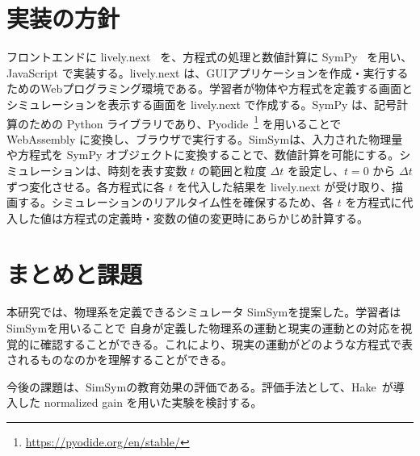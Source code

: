 \documentclass[11pt, a4paper, oneside, twocolumn, dvipdfmx]{jsarticle}
\newcommand{\simname}{SimSym}
\begin{document}
\section{実装の方針} \label{sec3}
フロントエンドに lively.next~\cite{ingalls_2008} を、方程式の処理と数値計算に SymPy~\cite{meurer_sympy_2017} を用い、JavaScript で実装する。lively.next は、GUIアプリケーションを作成・実行するためのWebプログラミング環境である。学習者が物体や方程式を定義する画面とシミュレーションを表示する画面を lively.next で作成する。SymPy は、記号計算のための Python ライブラリであり、Pyodide~\footnote{\url{https://pyodide.org/en/stable/}} を用いることで WebAssembly に変換し、ブラウザで実行する。\simname は、入力された物理量や方程式を SymPy オブジェクトに変換することで、数値計算を可能にする。シミュレーションは、時刻を表す変数 $t$ の範囲と粒度 $\Delta t$ を設定し、$t=0$ から $\Delta t$ ずつ変化させる。各方程式に各 $t$ を代入した結果を lively.next が受け取り、描画する。シミュレーションのリアルタイム性を確保するため、各 $t$ を方程式に代入した値は方程式の定義時・変数の値の変更時にあらかじめ計算する。

\section{まとめと課題}
本研究では、物理系を定義できるシミュレータ \simname を提案した。学習者は\simname を用いることで
自身が定義した物理系の運動と現実の運動との対応を視覚的に確認することができる。これにより、現実の運動がどのような方程式で表されるものなのかを理解することができる。

今後の課題は、\simname の教育効果の評価である。評価手法として、Hake~\cite{hake_1998}が導入した normalized gain を用いた実験を検討する。


\tiny{}
\end{document}

